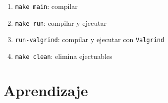 \documentclass[11pt, a4paper]{article}
\begin{document}
\begin{multicols}{2}
\begin{enumerate}[label=\roman*.]
    \item \texttt{make main}: compilar
    \item \texttt{make run}: compilar y ejecutar
    \item \texttt{run-valgrind}: compilar y ejecutar con \texttt{Valgrind}
    \item \texttt{make clean}: elimina ejectuables
\end{enumerate}
\section*{Aprendizaje}


\end{multicols}
\end{document}
